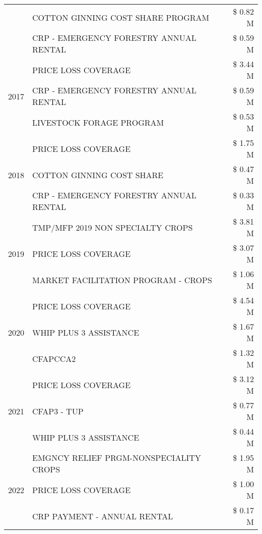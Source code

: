 \begin{tabular}{llr}
 & COTTON GINNING COST SHARE PROGRAM & \$ 0.82 M \\
 & CRP - EMERGENCY FORESTRY ANNUAL RENTAL & \$ 0.59 M \\
\cline{1-3}
\multirow[t]{3}{*}{2017} & PRICE LOSS COVERAGE & \$ 3.44 M \\
 & CRP - EMERGENCY FORESTRY ANNUAL RENTAL & \$ 0.59 M \\
 & LIVESTOCK FORAGE PROGRAM & \$ 0.53 M \\
\cline{1-3}
\multirow[t]{3}{*}{2018} & PRICE LOSS COVERAGE & \$ 1.75 M \\
 & COTTON GINNING COST SHARE & \$ 0.47 M \\
 & CRP - EMERGENCY FORESTRY ANNUAL RENTAL & \$ 0.33 M \\
\cline{1-3}
\multirow[t]{3}{*}{2019} & TMP/MFP 2019 NON SPECIALTY CROPS & \$ 3.81 M \\
 & PRICE LOSS COVERAGE & \$ 3.07 M \\
 & MARKET FACILITATION PROGRAM - CROPS & \$ 1.06 M \\
\cline{1-3}
\multirow[t]{3}{*}{2020} & PRICE LOSS COVERAGE & \$ 4.54 M \\
 & WHIP PLUS 3 ASSISTANCE & \$ 1.67 M \\
 & CFAPCCA2 & \$ 1.32 M \\
\cline{1-3}
\multirow[t]{3}{*}{2021} & PRICE LOSS COVERAGE & \$ 3.12 M \\
 & CFAP3 - TUP & \$ 0.77 M \\
 & WHIP PLUS 3 ASSISTANCE & \$ 0.44 M \\
\cline{1-3}
\multirow[t]{3}{*}{2022} & EMGNCY RELIEF PRGM-NONSPECIALITY CROPS & \$ 1.95 M \\
 & PRICE LOSS COVERAGE & \$ 1.00 M \\
 & CRP PAYMENT - ANNUAL RENTAL & \$ 0.17 M \\
\cline{1-3}
\bottomrule
\end{tabular}
